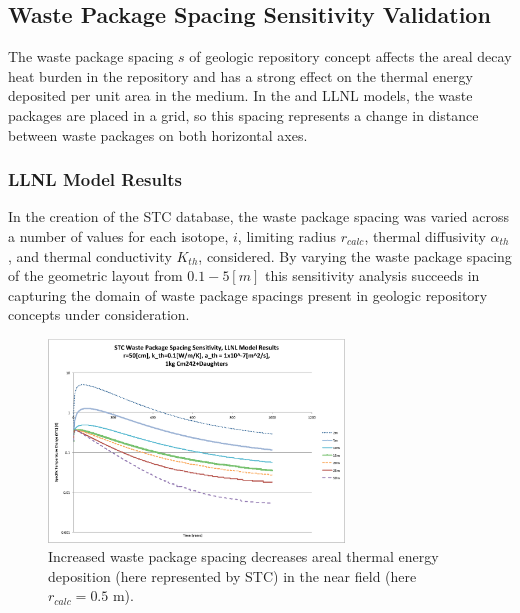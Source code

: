 \subsection{Waste Package Spacing Sensitivity Validation}\label{sec:spacing}
The waste package spacing $s$ of geologic repository concept affects the areal 
decay heat burden in the repository and has a strong effect on the thermal 
energy deposited per unit area in the medium. In the \Cyder and \gls{LLNL} 
models, the waste packages are placed in a grid, so this spacing represents a 
change in distance between waste packages on both horizontal axes.

\FloatBarrier
\subsubsection{LLNL Model Results}

In the creation of the \gls{STC} database, the waste package spacing was varied 
across a number of values for each isotope, $i$, limiting 
radius $r_{calc}$, thermal diffusivity $\alpha_{th}$, and thermal conductivity $K_{th}$, considered.  By 
varying the waste package spacing of the geometric layout from $0.1-5 [m]$
this sensitivity analysis succeeds in capturing the domain of 
waste package spacings present in geologic repository concepts under 
consideration. 

\begin{figure}[htbp!]
\begin{center}
\includegraphics[width=0.7\textwidth]{./chapters/demonstration/spacing/Cm242spacing_sens.eps}
\end{center}
\caption[Thermal Sensitivity to $K_{th}$ and $s$]{Increased waste package 
spacing decreases areal thermal energy deposition 
(here represented by \gls{STC}) in the near field (here $r_{calc} = 0.5$ m).}
\label{fig:Cm242spacing_sens}
\end{figure}

